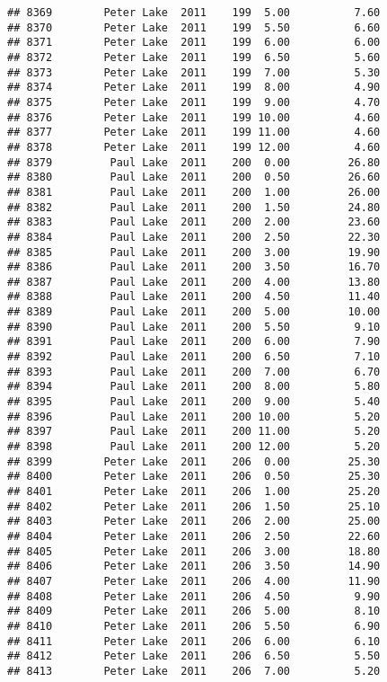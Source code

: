\documentclass[
]{article}
\begin{document}
\begin{verbatim}
## 8369        Peter Lake  2011    199  5.00          7.60
## 8370        Peter Lake  2011    199  5.50          6.60
## 8371        Peter Lake  2011    199  6.00          6.00
## 8372        Peter Lake  2011    199  6.50          5.60
## 8373        Peter Lake  2011    199  7.00          5.30
## 8374        Peter Lake  2011    199  8.00          4.90
## 8375        Peter Lake  2011    199  9.00          4.70
## 8376        Peter Lake  2011    199 10.00          4.60
## 8377        Peter Lake  2011    199 11.00          4.60
## 8378        Peter Lake  2011    199 12.00          4.60
## 8379         Paul Lake  2011    200  0.00         26.80
## 8380         Paul Lake  2011    200  0.50         26.60
## 8381         Paul Lake  2011    200  1.00         26.00
## 8382         Paul Lake  2011    200  1.50         24.80
## 8383         Paul Lake  2011    200  2.00         23.60
## 8384         Paul Lake  2011    200  2.50         22.30
## 8385         Paul Lake  2011    200  3.00         19.90
## 8386         Paul Lake  2011    200  3.50         16.70
## 8387         Paul Lake  2011    200  4.00         13.80
## 8388         Paul Lake  2011    200  4.50         11.40
## 8389         Paul Lake  2011    200  5.00         10.00
## 8390         Paul Lake  2011    200  5.50          9.10
## 8391         Paul Lake  2011    200  6.00          7.90
## 8392         Paul Lake  2011    200  6.50          7.10
## 8393         Paul Lake  2011    200  7.00          6.70
## 8394         Paul Lake  2011    200  8.00          5.80
## 8395         Paul Lake  2011    200  9.00          5.40
## 8396         Paul Lake  2011    200 10.00          5.20
## 8397         Paul Lake  2011    200 11.00          5.20
## 8398         Paul Lake  2011    200 12.00          5.20
## 8399        Peter Lake  2011    206  0.00         25.30
## 8400        Peter Lake  2011    206  0.50         25.30
## 8401        Peter Lake  2011    206  1.00         25.20
## 8402        Peter Lake  2011    206  1.50         25.10
## 8403        Peter Lake  2011    206  2.00         25.00
## 8404        Peter Lake  2011    206  2.50         22.60
## 8405        Peter Lake  2011    206  3.00         18.80
## 8406        Peter Lake  2011    206  3.50         14.90
## 8407        Peter Lake  2011    206  4.00         11.90
## 8408        Peter Lake  2011    206  4.50          9.90
## 8409        Peter Lake  2011    206  5.00          8.10
## 8410        Peter Lake  2011    206  5.50          6.90
## 8411        Peter Lake  2011    206  6.00          6.10
## 8412        Peter Lake  2011    206  6.50          5.50
## 8413        Peter Lake  2011    206  7.00          5.20

\end{verbatim}
\end{document}
